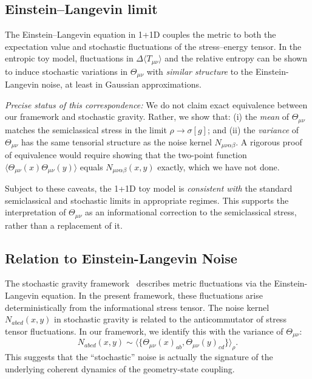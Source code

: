 \documentclass[aps,prd,twocolumn,superscriptaddress,nofootinbib,floatfix]{revtex4-2}
\newcommand{\Tmn}{\Theta_{\mu\nu}}
\begin{document}
\subsection{Einstein--Langevin limit}

The Einstein--Langevin equation in 1+1D couples the metric to both the expectation value and stochastic fluctuations of the stress--energy tensor.
In the entropic toy model, fluctuations in $\Delta\!\langle T_{\mu\nu}\rangle$ and the relative entropy can be shown to induce stochastic variations in $\Tmn$ with \emph{similar structure} to the Einstein-Langevin noise, at least in Gaussian approximations.

\emph{Precise status of this correspondence:} We do not claim exact equivalence between our framework and stochastic gravity. Rather, we show that: (i) the \emph{mean} of $\Tmn$ matches the semiclassical stress in the limit $\rho \to \sigma[g]$; and (ii) the \emph{variance} of $\Tmn$ has the same tensorial structure as the noise kernel $N_{\mu\nu\alpha\beta}$. A rigorous proof of equivalence would require showing that the two-point function $\langle \Tmn(x) \Tmn(y) \rangle$ equals $N_{\mu\nu\alpha\beta}(x,y)$ exactly, which we have not done.

Subject to these caveats, the 1+1D toy model is \emph{consistent with} the standard semiclassical and stochastic limits in appropriate regimes.
This supports the interpretation of $\Tmn$ as an informational correction to the semiclassical stress, rather than a replacement of it.

\subsection{Relation to Einstein-Langevin Noise}
The stochastic gravity framework~\cite{HuVerdaguer2008} describes metric fluctuations via the Einstein-Langevin equation.
In the present framework, these fluctuations arise deterministically from the informational stress tensor.
The noise kernel $N_{abcd}(x,y)$ in stochastic gravity is related to the anticommutator of stress tensor fluctuations.
In our framework, we identify this with the variance of $\Tmn$:
\begin{equation}
    N_{abcd}(x,y) \sim \langle \{ \Tmn(x)_{ab}, \Tmn(y)_{cd} \} \rangle_\rho.
\end{equation}
This suggests that the ``stochastic'' noise is actually the signature of the underlying coherent dynamics of the geometry-state coupling.
\end{document}
